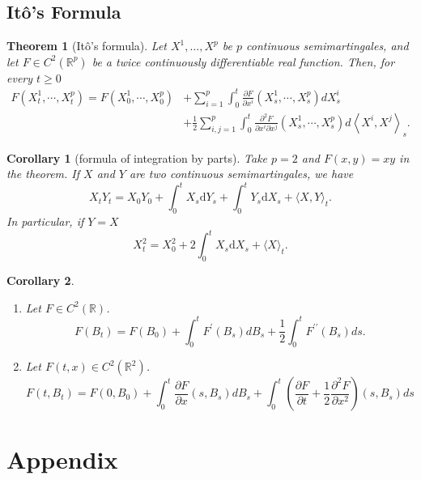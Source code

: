 \documentclass{article}
\newtheorem{corollary}{Corollary}[section]
\newtheorem{theorem}{Theorem}[section]
\theoremstyle{nonumberplain}
\begin{document}
\subsection{Itô's Formula}
\begin{theorem}[Itô's formula]
	Let $X^{1}, \ldots, X^{p}$ be $p$ continuous semimartingales, and let $F\in C^2(\mathbb{R}^{p})$ be a twice continuously differentiable real function. Then, for every $t \geq 0$
	\[
	\begin{aligned}
	F\left(X_{t}^{1}, \cdots, X_{t}^{p}\right)=F\left(X_{0}^{1}, \cdots, X_{0}^{p}\right) &+\sum_{i=1}^{p} \int_{0}^{t} \frac{\partial F}{\partial x^{i}}\left(X_{s}^{1}, \cdots, X_{s}^{p}\right) d X_{s}^{i} \\
	&+\frac{1}{2} \sum_{i, j=1}^{p} \int_{0}^{t} \frac{\partial^{2} F}{\partial x^{i} \partial x^{j}}\left(X_{s}^{1}, \cdots, X_{s}^{p}\right) d\left\langle X^{i}, X^{j}\right\rangle_{s}.
	\end{aligned}
	\]
\end{theorem}

\begin{corollary}[formula of integration by parts]
	Take $p=2$ and $F(x, y)=x y$ in the theorem. If $X$ and $Y$ are two continuous semimartingales, we have
	\[
	X_{t} Y_{t}=X_{0} Y_{0}+\int_{0}^{t} X_{s} \mathrm{d} Y_{s}+\int_{0}^{t} Y_{s} \mathrm{d} X_{s}+\langle X, Y\rangle_{t}.
	\]
	In particular, if $Y=X$
	\[
	X_{t}^{2}=X_{0}^{2}+2 \int_{0}^{t} X_{s} \mathrm{d} X_{s}+\langle X\rangle_{t}.
	\]
\end{corollary}

\begin{corollary}
	\begin{enumerate}
		\item Let $F\in C^2(\mathbb{R})$.
		$$F\left(B_{t}\right)=F\left(B_{0}\right)+\int_{0}^{t} F^{\prime}\left(B_{s}\right) d B_{s}+\frac{1}{2} \int_{0}^{t} F^{\prime \prime}\left(B_{s}\right) d s.$$
		\item Let $F(t,x)\in C^2(\mathbb{R}^2)$.
		\[
		F\left(t, B_{t}\right)=F\left(0, B_{0}\right)+\int_{0}^{t} \frac{\partial F}{\partial x}\left(s, B_{s}\right) d B_{s}+\int_{0}^{t}\left(\frac{\partial F}{\partial t}+\frac{1}{2} \frac{\partial^{2} F}{\partial x^{2}}\right)\left(s, B_{s}\right) d s
		\]
	\end{enumerate}
	
	
\end{corollary}


\newpage

\section*{Appendix}
\end{document}
